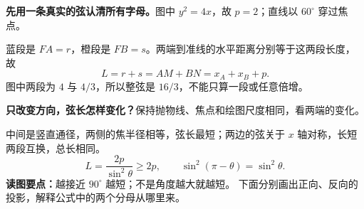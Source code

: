 \clearpage
\begin{explanationbox}
\textbf{先用一条真实的弦认清所有字母。}图中 $y^2=4x$，故 $p=2$；直线以 $60^\circ$ 穿过焦点。
\begin{center}\end{center}
蓝段是 $FA=r$，橙段是 $FB=s$。两端到准线的水平距离分别等于这两段长度，故
\[
 L=r+s=AM+BN=x_A+x_B+p.
\]
图中两段为 $4$ 与 $4/3$，所以整弦是 $16/3$，不能只算一段或任意倍增。
\end{explanationbox}
\clearpage
\begin{explanationbox}
\textbf{只改变方向，弦长怎样变化？}保持抛物线、焦点和绘图尺度相同，看两端的变化。
\begin{center}\end{center}
中间是竖直通径，两侧的焦半径相等，弦长最短；两边的弦关于 $x$ 轴对称，长短两段互换，总长相同。
\[
 L=\frac{2p}{\sin^2\theta}\ge2p,\qquad
 \sin^2(\pi-\theta)=\sin^2\theta.
\]
\textbf{读图要点：}越接近 $90^\circ$ 越短；不是角度越大就越短。
下面分别画出正向、反向的投影，解释公式中的两个分母从哪里来。
\end{explanationbox}
